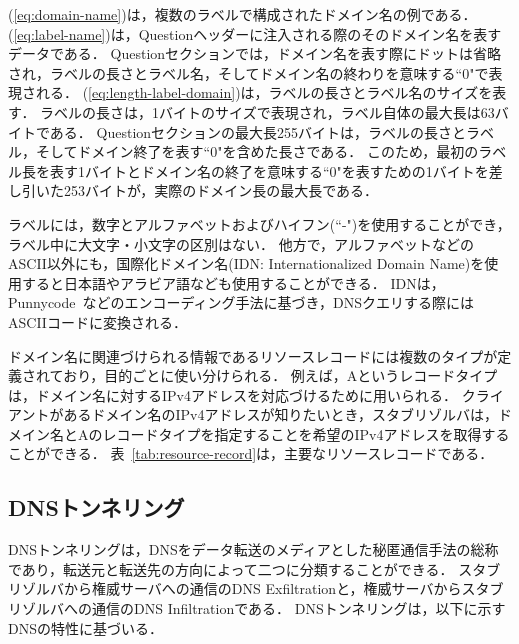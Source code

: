 (\ref{eq:domain-name})は，複数のラベルで構成されたドメイン名の例である．
(\ref{eq:label-name})は，Questionヘッダーに注入される際のそのドメイン名を表すデータである．
Questionセクションでは，ドメイン名を表す際にドットは省略され，ラベルの長さとラベル名，そしてドメイン名の終わりを意味する``0"で表現される．
(\ref{eq:length-label-domain})は，ラベルの長さとラベル名のサイズを表す．
ラベルの長さは，1バイトのサイズで表現され，ラベル自体の最大長は63バイトである．
Questionセクションの最大長255バイトは，ラベルの長さとラベル，そしてドメイン終了を表す``0"を含めた長さである．
このため，最初のラベル長を表す1バイトとドメイン名の終了を意味する``0"を表すための1バイトを差し引いた253バイトが，実際のドメイン長の最大長である．


ラベルには，数字とアルファベットおよびハイフン(``-")を使用することができ，ラベル中に大文字・小文字の区別はない．
他方で，アルファベットなどのASCII以外にも，国際化ドメイン名(IDN: Internationalized Domain Name)を使用すると日本語やアラビア語なども使用することができる．
IDNは，Punnycode~\cite{punnycode}などのエンコーディング手法に基づき，DNSクエリする際にはASCIIコードに変換される．

ドメイン名に関連づけられる情報であるリソースレコードには複数のタイプが定義されており，目的ごとに使い分けられる．
例えば，Aというレコードタイプは，ドメイン名に対するIPv4アドレスを対応づけるために用いられる．
クライアントがあるドメイン名のIPv4アドレスが知りたいとき，スタブリゾルバは，ドメイン名とAのレコードタイプを指定することを希望のIPv4アドレスを取得することができる．
表~\ref{tab:resource-record}は，主要なリソースレコードである．




\subsection{DNSトンネリング}
\label{sec:dns-tunneling}
DNSトンネリングは，DNSをデータ転送のメディアとした秘匿通信手法の総称であり，転送元と転送先の方向によって二つに分類することができる．
スタブリゾルバから権威サーバへの通信のDNS Exfiltrationと，権威サーバからスタブリゾルバへの通信のDNS Infiltrationである．
DNSトンネリングは，以下に示すDNSの特性に基づいる．

